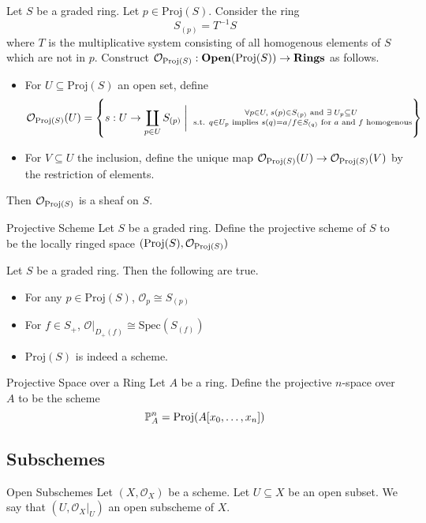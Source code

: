 \documentclass[a4paper]{article}
\begin{document}
\begin{thm}{}{} Let $S$ be a graded ring. Let $p\in\text{Proj}(S)$. Consider the ring $$S_{(p)}=T^{-1}S$$ where $T$ is the multiplicative system consisting of all homogenous elements of $S$ which are not in $p$. Construct $\mathcal{O}_{\text{Proj}(S)}:\bold{Open}(\text{Proj}(S))\to\bold{Rings}$ as follows. 
\begin{itemize}
\item For $U\subseteq\text{Proj}(S)$ an open set, define $$\mathcal{O}_{\text{Proj}(S)}(U)=\left\{s:U\to\coprod_{p\in U}S_{(p)}\;\bigg{|}\;\substack{\forall p\in U,\;s(p)\in S_{(p)}\text{ and }\exists\;U_p\subseteq U\\\text{ s.t. }q\in U_p\text{ implies }s(q)=a/f\in S_{(q)}\text{ for }a\text{ and }f\text{ homogenous}}\right\}$$
\item For $V\subseteq U$ the inclusion, define the unique map $\mathcal{O}_{\text{Proj}(S)}(U)\to\mathcal{O}_{\text{Proj}(S)}(V)$ by the restriction of elements. 
\end{itemize}
Then $\mathcal{O}_{\text{Proj}(S)}$ is a sheaf on $S$. 
\end{thm}

\begin{defn}{Projective Scheme}{} Let $S$ be a graded ring. Define the projective scheme of $S$ to be the locally ringed space $(\text{Proj}(S),\mathcal{O}_{\text{Proj}(S)})$
\end{defn}

\begin{prp}{}{} Let $S$ be a graded ring. Then the following are true. 
\begin{itemize}
\item For any $p\in\text{Proj}(S)$, $\mathcal{O}_{p}\cong S_{(p)}$
\item For $f\in S_+$, $\mathcal{O}|_{D_+(f)}\cong\text{Spec}(S_{(f)})$
\item $\text{Proj}(S)$ is indeed a scheme. 
\end{itemize}
\end{prp}

\begin{defn}{Projective Space over a Ring}{} Let $A$ be a ring. Define the projective $n$-space over $A$ to be the scheme $$\mathbb{P}_A^n=\text{Proj}(A[x_0,\dots,x_n])$$
\end{defn}

\subsection{Subschemes}
\begin{defn}{Open Subschemes}{} Let $(X,\mathcal{O}_X)$ be a scheme. Let $U\subseteq X$ be an open subset. We say that $(U,\mathcal{O}_X|_U)$ an open subscheme of $X$. 
\end{defn}
\end{document}
